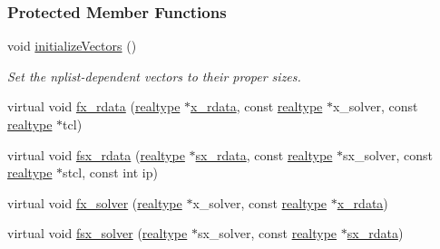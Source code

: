 \subsubsection*{Protected Member Functions}
\begin{DoxyCompactItemize}
\item 
\mbox{\label{classamici_1_1_model_a01b01e15d5cac9cec911a30f65e327f8}} 
void \mbox{\hyperlink{classamici_1_1_model_a01b01e15d5cac9cec911a30f65e327f8}{initialize\+Vectors}} ()
\begin{DoxyCompactList}\small\item\em Set the nplist-\/dependent vectors to their proper sizes. \end{DoxyCompactList}\item 
virtual void \mbox{\hyperlink{classamici_1_1_model_acd7cb8852c42c31704a5bd8a3410d1d9}{fx\+\_\+rdata}} (\mbox{\hyperlink{namespaceamici_a1bdce28051d6a53868f7ccbf5f2c14a3}{realtype}} $\ast$\mbox{\hyperlink{classamici_1_1_model_a297a15f378087de3c782f5af7f29510b}{x\+\_\+rdata}}, const \mbox{\hyperlink{namespaceamici_a1bdce28051d6a53868f7ccbf5f2c14a3}{realtype}} $\ast$x\+\_\+solver, const \mbox{\hyperlink{namespaceamici_a1bdce28051d6a53868f7ccbf5f2c14a3}{realtype}} $\ast$tcl)
\item 
virtual void \mbox{\hyperlink{classamici_1_1_model_a6e270d5522af5b494db82a52e5b40e24}{fsx\+\_\+rdata}} (\mbox{\hyperlink{namespaceamici_a1bdce28051d6a53868f7ccbf5f2c14a3}{realtype}} $\ast$\mbox{\hyperlink{classamici_1_1_model_a61ffc2a1fd9c46b5869ab4321e70d791}{sx\+\_\+rdata}}, const \mbox{\hyperlink{namespaceamici_a1bdce28051d6a53868f7ccbf5f2c14a3}{realtype}} $\ast$sx\+\_\+solver, const \mbox{\hyperlink{namespaceamici_a1bdce28051d6a53868f7ccbf5f2c14a3}{realtype}} $\ast$stcl, const int ip)
\item 
virtual void \mbox{\hyperlink{classamici_1_1_model_ac08ad3aa4016a5a3ff89d601e15971cc}{fx\+\_\+solver}} (\mbox{\hyperlink{namespaceamici_a1bdce28051d6a53868f7ccbf5f2c14a3}{realtype}} $\ast$x\+\_\+solver, const \mbox{\hyperlink{namespaceamici_a1bdce28051d6a53868f7ccbf5f2c14a3}{realtype}} $\ast$\mbox{\hyperlink{classamici_1_1_model_a297a15f378087de3c782f5af7f29510b}{x\+\_\+rdata}})
\item 
virtual void \mbox{\hyperlink{classamici_1_1_model_acaa80cbfc886abd3a0f038f5ff9f54e3}{fsx\+\_\+solver}} (\mbox{\hyperlink{namespaceamici_a1bdce28051d6a53868f7ccbf5f2c14a3}{realtype}} $\ast$sx\+\_\+solver, const \mbox{\hyperlink{namespaceamici_a1bdce28051d6a53868f7ccbf5f2c14a3}{realtype}} $\ast$\mbox{\hyperlink{classamici_1_1_model_a61ffc2a1fd9c46b5869ab4321e70d791}{sx\+\_\+rdata}})

\end{DoxyCompactItemize}
